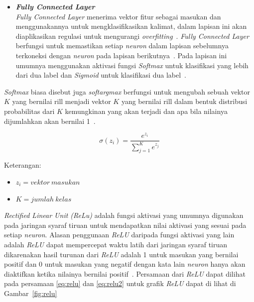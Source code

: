 \begin{itemize}
      \item \emph{\bfseries Fully Connected Layer}\\
      \emph{Fully Connected Layer} menerima vektor fitur sebagai masukan dan menggunakannya
      untuk mengklasifikasikan kalimat, dalam lapisan ini akan diaplikasikan regulasi untuk
      mengurangi \emph{overfitting}~\citep{Abdurrahman2020}. \emph{Fully Connected Layer} berfungsi
      untuk memastikan setiap \emph{neuron} dalam lapisan sebelumnya terkoneksi dengan \emph{neuron}
      pada lapisan berikutnya~\citep{Pandey2022}. Pada lapisan ini umumnya menggunakan aktivasi
      fungsi \emph{Softmax} untuk klasifikasi yang lebih dari dua label dan \emph{Sigmoid} untuk
      klasifikasi dua label~\citep{Li2021}.
\end{itemize}

\emph{Softmax} biasa disebut juga \emph{softargmax} berfungsi untuk mengubah sebuah vektor $K$ yang
bernilai rill menjadi vektor $K$ yang bernilai rill dalam bentuk distribusi probabilitas dari $K$
kemungkinan yang akan terjadi dan apa bila nilainya dijumlahkan akan bernilai 1~\citep{Wood2019}.

\begin{equation}\label{eq:softmax}
      \sigma(z_i) = \frac{e^{z_{i}}}{\sum_{j=1}^K e^{z_{j}}}
\end{equation}

Keterangan:
\begin{itemize}
      \item $z_i = vektor \ masukan$
      \item $K = jumlah \ kelas$
\end{itemize}

\emph{Rectified Linear Unit (ReLu)} adalah fungsi aktivasi yang umumnya digunakan pada jaringan
syaraf tiruan untuk mendapatkan nilai aktivasi yang sesuai pada setiap \emph{neuron}. Alasan penggunaan
\emph{ReLU} daripada fungsi aktivasi yang lain adalah \emph{ReLU} dapat mempercepat waktu latih dari
jaringan syaraf tiruan dikarenakan hasil turunan dari \emph{ReLU} adalah 1 untuk masukan yang
bernilai positif dan 0 untuk masukan yang negatif dengan kata lain \emph{neuron} hanya akan
diaktifkan ketika nilainya bernilai positif~\citep{Li2021}. Persamaan dari \emph{ReLU} dapat dilihat pada persamaan
\ref{eq:relu} dan \ref{eq:relu2} untuk grafik \emph{ReLU} dapat di lihat di Gambar~\ref{fig:relu}

